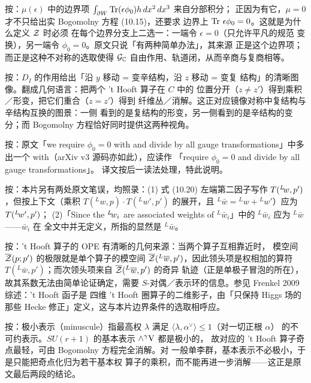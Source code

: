 \begin{yizhu}[含糊点拨]
按：$\mu(\epsilon)$ 中的边界项
$\int_{\partial W}\Tr(\epsilon\phi_0)h\,dx^2\,dx^3$ 来自分部积分；
正因为有它，$\mu=0$ 才不只给出实 Bogomolny 方程 (10.15)，还要求
边界上 $\Tr\,\epsilon\phi_0=0$。这就是为什么定义 ${\EUZ}$ 时必须
在每个边界分支上二选一：一端令 $\epsilon=0$（只允许平凡的规范
变换），另一端令 $\phi_0=0$。原文只说「有两种简单办法」，其来源
正是这个边界项；而正是这种不对称的选取使得 ${\cal G}_{\Bbb{C}}$
自由作用、轨道闭，从而辛商与复商相等。
\end{yizhu}

\begin{yizhu}[物理图像]
按：$D_I$ 的作用给出「沿 $y$ 移动 = 变辛结构，沿 $z$ 移动 = 变复
结构」的清晰图像。翻成几何语言：把两个 't Hooft 算子在 $C$ 中的
位置分开（$z\ne z'$）得到乘积／形变，把它们重合（$z=z'$）得到
纤维丛／消解。这正对应镜像对称中复结构与辛结构互换的图景：一侧
看到的是复结构的形变，另一侧看到的是辛结构的变分；而
Bogomolny 方程恰好同时提供这两种视角。
\end{yizhu}

\begin{yizhu}[原文疑误]
按：原文「we require $\phi_0=0$ with and divide by all gauge
transformations」中多出一个 with（arXiv v3 源码亦如此），应读作
「require $\phi_0=0$ and divide by all gauge transformations」。
译文按后一读法处理，特此说明。
\end{yizhu}

\begin{yizhu}[原文疑误]
按：本片另有两处原文笔误，均照录：(1) 式 (10.20) 左端第二因子写作
$T({}^L\negthinspace w,p')$，但按上下文（乘积
$T(^Lw,p)\cdot T(^Lw',p')$ 的展开，且 $^L\bar
w={}^Lw+{}^Lw'$）应为 $T({}^L\negthinspace w',p')$；
(2)「Since the $^L\negthinspace w_i$ are associated weights of
$^L\bar w_i$」中的 $^L\bar w_i$ 应为 $^L\bar w$——$\bar w_i$ 在
全文中并无定义，所指的显然是 $^L\bar w$。
\end{yizhu}

\begin{yizhu}[物理图像]
按：'t Hooft 算子的 OPE 有清晰的几何来源：当两个算子互相靠近时，
模空间 $\bar\EUZ(p;p')$ 的极限就是单个算子的模空间
$\bar\EUZ(^L\bar w,p')$，因此领头项是权相加的算符
$T(^L\bar w,p')$；而次领头项来自 $\bar\EUZ(^L\bar w,p')$ 的奇异
轨迹（正是单极子冒泡的所在），故其系数无法由简单论证确定，需要
$S$-对偶／表示环的信息。参见 Frenkel 2009 综述：'t Hooft 函子是
四维 't Hooft 圈算子的二维影子，由「只保持 Higgs 场的那些 Hecke
修正」定义，这与本片边界条件的选取相呼应。
\end{yizhu}

\begin{yizhu}[易错点]
按：极小表示（minuscule）指最高权 $\lambda$ 满足
$\langle\lambda,\alpha^\vee\rangle\le 1$（对一切正根 $\alpha$）
的不可约表示。$SU(r+1)$ 的基本表示 $\wedge^\gamma\VV$ 都是极小的，
故对应的 't Hooft 算子奇点最轻，可由 Bogomolny 方程完全消解。对
一般单李群，基本表示不必极小，于是只能把奇点化归为若干基本权
算子的乘积，而不能再进一步消解——这正是原文最后两段的结论。
\end{yizhu}
